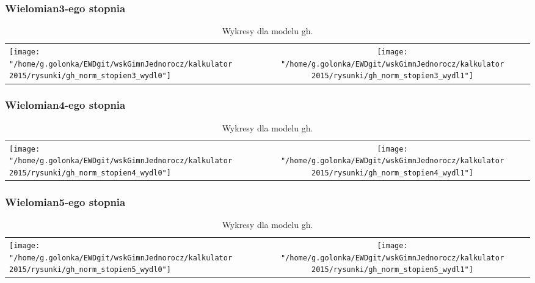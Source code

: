 \documentclass[]{article}
\begin{document}
\pagebreak

\subsubsection{Wielomian3-ego stopnia}\label{StopienWielomianu}\begin{table}[h] 
\begin{tabularx}{1\textwidth}{@{\hspace{1.7 mm}}Xcc@{\hspace{1.7 mm}}} 
\texttt{[image: "/home/g.golonka/EWDgit/wskGimnJednorocz/kalkulator 2015/rysunki/gh\_norm\_stopien3\_wydl0"]} 
& 
\texttt{[image: "/home/g.golonka/EWDgit/wskGimnJednorocz/kalkulator 2015/rysunki/gh\_norm\_stopien3\_wydl1"]} \\ 
\end{tabularx} 
\caption{Wykresy dla modelu gh.} 
\end{table}

\pagebreak

\subsubsection{Wielomian4-ego stopnia}\label{StopienWielomianu}\begin{table}[h] 
\begin{tabularx}{1\textwidth}{@{\hspace{1.7 mm}}Xcc@{\hspace{1.7 mm}}} 
\texttt{[image: "/home/g.golonka/EWDgit/wskGimnJednorocz/kalkulator 2015/rysunki/gh\_norm\_stopien4\_wydl0"]} 
& 
\texttt{[image: "/home/g.golonka/EWDgit/wskGimnJednorocz/kalkulator 2015/rysunki/gh\_norm\_stopien4\_wydl1"]} \\ 
\end{tabularx} 
\caption{Wykresy dla modelu gh.} 
\end{table}

\pagebreak

\subsubsection{Wielomian5-ego stopnia}\label{StopienWielomianu}\begin{table}[h] 
\begin{tabularx}{1\textwidth}{@{\hspace{1.7 mm}}Xcc@{\hspace{1.7 mm}}} 
\texttt{[image: "/home/g.golonka/EWDgit/wskGimnJednorocz/kalkulator 2015/rysunki/gh\_norm\_stopien5\_wydl0"]} 
& 
\texttt{[image: "/home/g.golonka/EWDgit/wskGimnJednorocz/kalkulator 2015/rysunki/gh\_norm\_stopien5\_wydl1"]} \\ 
\end{tabularx} 
\caption{Wykresy dla modelu gh.} 
\end{table}

\pagebreak
\end{document}
